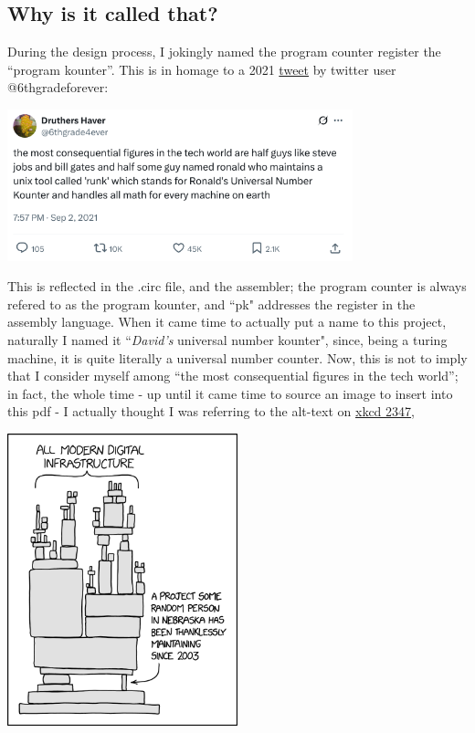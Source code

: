 \documentclass{article}
\begin{document}
\subsection{Why is it called that?}

During the design process, I jokingly named the program counter register the ``program kounter''. This is in homage to a 2021 \href{https://x.com/6thgrade4ever/status/1433519577892327424}{tweet} by twitter user @6thgradeforever:

    \begin{center}\includegraphics[width=0.75\textwidth]{images/runk.png}\end{center}

This is reflected in the .circ file, and the assembler; the program counter is always refered to as the program kounter, and ``pk" addresses the register in the assembly language. When it came time to actually put a name to this project, naturally I named it ``\textit{David's} universal number kounter", since, being a turing machine, it is quite literally a universal number counter. Now, this is not to imply that I consider myself among ``the most consequential figures in the tech world''; in fact, the whole time - up until it came time to source an image to insert into this pdf - 	I actually thought I was referring to the alt-text on \href{https://xkcd.com/2347/}{xkcd 2347},

    \begin{center}\includegraphics[width=0.5\textwidth]{images/2347.png}\end{center}
\end{document}

